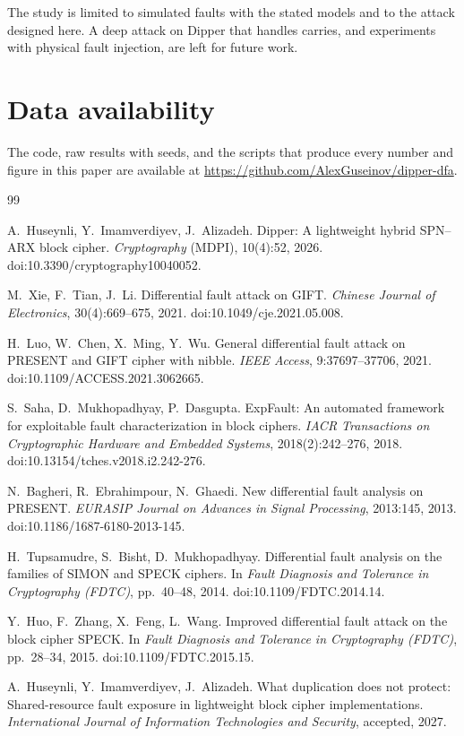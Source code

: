 \documentclass[11pt,a4paper]{article}
\begin{document}
The study is limited to simulated faults with the stated models and to the attack designed here.
A deep attack on Dipper that handles carries, and experiments with physical fault injection, are
left for future work.

\section*{Data availability}
The code, raw results with seeds, and the scripts that produce every number and figure in this
paper are available at \url{https://github.com/AlexGuseinov/dipper-dfa}.


\begin{thebibliography}{99}

A.~Huseynli, Y.~Imamverdiyev, J.~Alizadeh.
Dipper: A lightweight hybrid SPN--ARX block cipher.
\emph{Cryptography} (MDPI), 10(4):52, 2026.
doi:10.3390/cryptography10040052.

M.~Xie, F.~Tian, J.~Li.
Differential fault attack on GIFT.
\emph{Chinese Journal of Electronics}, 30(4):669--675, 2021.
doi:10.1049/cje.2021.05.008.

H.~Luo, W.~Chen, X.~Ming, Y.~Wu.
General differential fault attack on PRESENT and GIFT cipher with nibble.
\emph{IEEE Access}, 9:37697--37706, 2021.
doi:10.1109/ACCESS.2021.3062665.

S.~Saha, D.~Mukhopadhyay, P.~Dasgupta.
ExpFault: An automated framework for exploitable fault characterization in block ciphers.
\emph{IACR Transactions on Cryptographic Hardware and Embedded Systems}, 2018(2):242--276, 2018.
doi:10.13154/tches.v2018.i2.242-276.

N.~Bagheri, R.~Ebrahimpour, N.~Ghaedi.
New differential fault analysis on PRESENT.
\emph{EURASIP Journal on Advances in Signal Processing}, 2013:145, 2013.
doi:10.1186/1687-6180-2013-145.

H.~Tupsamudre, S.~Bisht, D.~Mukhopadhyay.
Differential fault analysis on the families of SIMON and SPECK ciphers.
In \emph{Fault Diagnosis and Tolerance in Cryptography (FDTC)}, pp.~40--48, 2014.
doi:10.1109/FDTC.2014.14.

Y.~Huo, F.~Zhang, X.~Feng, L.~Wang.
Improved differential fault attack on the block cipher SPECK.
In \emph{Fault Diagnosis and Tolerance in Cryptography (FDTC)}, pp.~28--34, 2015.
doi:10.1109/FDTC.2015.15.

A.~Huseynli, Y.~Imamverdiyev, J.~Alizadeh.
What duplication does not protect: Shared-resource fault exposure in lightweight block cipher
implementations.
\emph{International Journal of Information Technologies and Security}, accepted, 2027.

\end{thebibliography}
\end{document}
